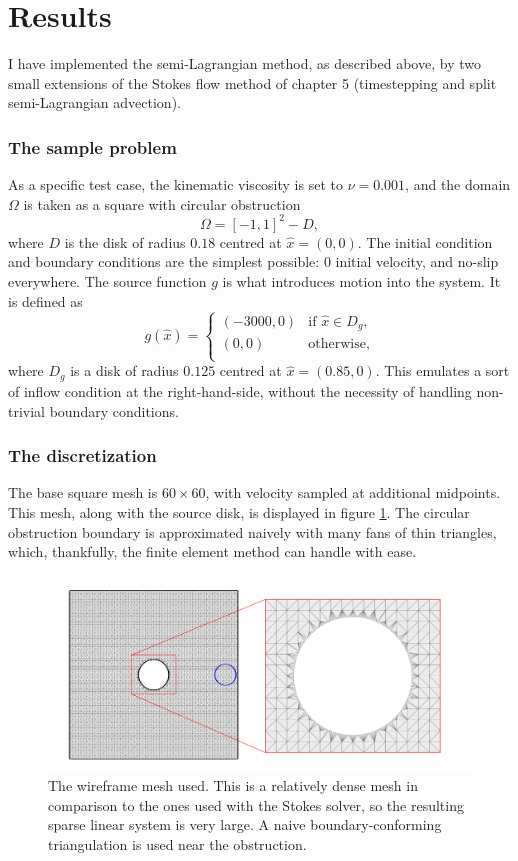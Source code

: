 \section{Results}
I have implemented the semi-Lagrangian method, as described above, by two small extensions
of the Stokes flow method of chapter 5
(timestepping and split semi-Lagrangian advection).
\subsubsection{The sample problem}
As a specific test case, the kinematic viscosity is set to $\nu = 0.001$, and
the domain $\Omega$ is taken as a square with circular obstruction
    $$\Omega = [-1,1]^2 - D,$$
where $D$ is the disk of radius $0.18$ centred at $\hat{x} = (0,0)$.
The initial condition and boundary conditions are the simplest possible: $0$ initial velocity, and no-slip everywhere.
The source function $g$ is what introduces motion into the system. It is defined as
$$
g(\hat{x}) = 
    \left\{\begin{array}{lr}
        (-3000, 0) &\text{if $\hat{x} \in D_g$},\\
        (0, 0) &\text{otherwise},\\
        \end{array}\right.
$$
where $D_g$ is a disk of radius $0.125$ centred at $\hat{x} = (0.85, 0)$.
This emulates a sort of inflow condition at the right-hand-side, without the necessity of handling non-trivial boundary conditions.

\subsubsection{The discretization}
The base square mesh is $60 \times 60$, with velocity sampled at additional midpoints. This mesh, along with the source disk, is
displayed in figure \ref{navier_wireframe}. The circular obstruction boundary is approximated naively with many fans of thin triangles,
which, thankfully, the finite element method can handle with ease.

\begin{figure}[H]
    \centering
    \includegraphics[width=1\textwidth]{figures/navier_stokes/wireframe_full.png}
    \caption{\small
        The wireframe mesh used. This is a relatively dense mesh in comparison to the
        ones used with the Stokes solver, so the resulting sparse linear system is very large.
        A naive boundary-conforming triangulation is used near the obstruction.
    }
    \label{navier_wireframe}
\end{figure}

